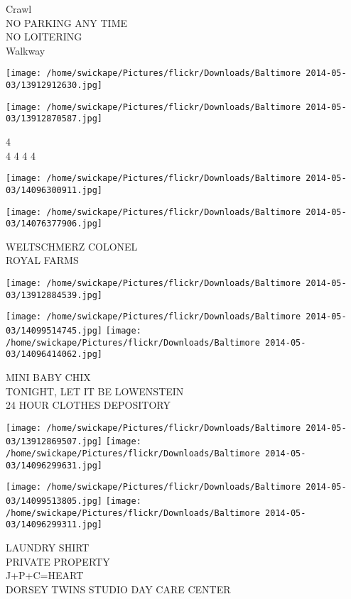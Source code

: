 \documentclass[10pt,letterpaper]{article}
\begin{document}
Crawl\\
NO PARKING ANY TIME\\
NO LOITERING\\
Walkway\\
\pagebreak

\texttt{[image: /home/swickape/Pictures/flickr/Downloads/Baltimore 2014-05-03/13912912630.jpg]}

\vspace{0.25in}
\texttt{[image: /home/swickape/Pictures/flickr/Downloads/Baltimore 2014-05-03/13912870587.jpg]}

4\\
4 4 4 4\\
\pagebreak

\texttt{[image: /home/swickape/Pictures/flickr/Downloads/Baltimore 2014-05-03/14096300911.jpg]}

\vspace{0.25in}
\texttt{[image: /home/swickape/Pictures/flickr/Downloads/Baltimore 2014-05-03/14076377906.jpg]}

WELTSCHMERZ COLONEL\\
ROYAL FARMS\\
\pagebreak

\texttt{[image: /home/swickape/Pictures/flickr/Downloads/Baltimore 2014-05-03/13912884539.jpg]}

\vspace{0.25in}
\texttt{[image: /home/swickape/Pictures/flickr/Downloads/Baltimore 2014-05-03/14099514745.jpg]}
\texttt{[image: /home/swickape/Pictures/flickr/Downloads/Baltimore 2014-05-03/14096414062.jpg]}

MINI BABY CHIX\\
TONIGHT, LET IT BE LOWENSTEIN\\
24 HOUR CLOTHES DEPOSITORY\\
\pagebreak

\texttt{[image: /home/swickape/Pictures/flickr/Downloads/Baltimore 2014-05-03/13912869507.jpg]}
\texttt{[image: /home/swickape/Pictures/flickr/Downloads/Baltimore 2014-05-03/14096299631.jpg]}

\texttt{[image: /home/swickape/Pictures/flickr/Downloads/Baltimore 2014-05-03/14099513805.jpg]}
\texttt{[image: /home/swickape/Pictures/flickr/Downloads/Baltimore 2014-05-03/14096299311.jpg]}

LAUNDRY SHIRT\\
PRIVATE PROPERTY\\
J+P+C=HEART\\
DORSEY TWINS STUDIO DAY CARE CENTER\\
\pagebreak
\end{document}
